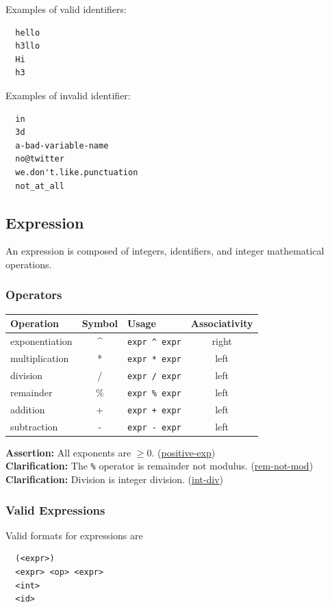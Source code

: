 \documentclass{article}
\newcommand{\code}[1]{\texttt{\textmd{#1}}}
\newcommand{\assertion}[2]{\textbf{Assertion: }#1 (\hyperlink{#2}{#2})}
\newcommand{\clarification}[2]{\textbf{Clarification: }#1 (\hyperlink{#2}{#2})}
\begin{document}
Examples of valid identifiers:
\begin{lstlisting}
  hello
  h3llo
  Hi
  h3
\end{lstlisting}

Examples of invalid identifier:
\begin{lstlisting}
  in
  3d
  a-bad-variable-name
  no@twitter
  we.don't.like.punctuation
  not_at_all
\end{lstlisting}

\subsection{Expression}
An expression is composed of integers, identifiers, and integer mathematical operations.

\subsubsection{Operators}
\begin{center}
  \begin{tabular}{|l|c|l|c|}
    \hline
    \textbf{Operation} & \textbf{Symbol} & \textbf{Usage} &
    \textbf{Associativity} \\
    \hline
    exponentiation & \textasciicircum & \code{expr \textasciicircum\ expr} & right\\
    multiplication & *  & \code{expr * expr}  & left \\
    division       & /  & \code{expr / expr}  & left \\
    remainder      & \% & \code{expr \% expr}  & left \\
    addition       & +  & \code{expr + expr}  & left \\
    subtraction    & -  & \code{expr - expr}  & left \\
    \hline
  \end{tabular}
\end{center}

\assertion{All exponents are $\geq 0$.}{positive-exp}\\
\clarification{The \code{\%} operator is remainder not modulus.}{rem-not-mod}\\
\clarification{Division is integer division.}{int-div}

\subsubsection{Valid Expressions}
Valid formats for expressions are
\begin{lstlisting}
  (<expr>)
  <expr> <op> <expr>
  <int>
  <id>
\end{lstlisting}
\end{document}
